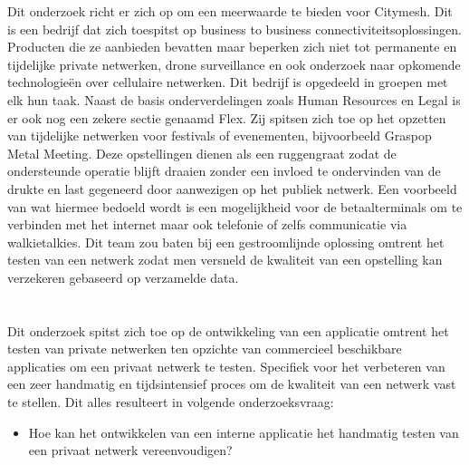
Dit onderzoek richt er zich op om een meerwaarde te bieden voor Citymesh. Dit is een bedrijf dat zich toespitst op business to business connectiviteitsoplossingen. Producten die ze aanbieden bevatten maar beperken zich niet tot permanente en tijdelijke private netwerken, drone surveillance en ook onderzoek naar opkomende technologieën over cellulaire netwerken. Dit bedrijf is opgedeeld in groepen met elk hun taak. Naast de basis onderverdelingen zoals Human Resources en Legal is er ook nog een zekere sectie genaamd Flex. Zij spitsen zich toe op het opzetten van tijdelijke netwerken voor festivals of evenementen, bijvoorbeeld Graspop Metal Meeting. Deze opstellingen dienen als een ruggengraat zodat de ondersteunde operatie blijft draaien zonder een invloed te ondervinden van de drukte en last gegeneerd door aanwezigen op het publiek netwerk. Een voorbeeld van wat hiermee bedoeld wordt is een mogelijkheid voor de betaalterminals om te verbinden met het internet maar ook telefonie of zelfs communicatie via walkietalkies. Dit team zou baten bij een gestroomlijnde oplossing omtrent het testen van een netwerk zodat men versneld de kwaliteit van een opstelling kan verzekeren gebaseerd op verzamelde data.

\section{}%
\label{sec:onderzoeksvraag}

Dit onderzoek spitst zich toe op de ontwikkeling van een applicatie omtrent het testen van private netwerken ten opzichte van commercieel beschikbare applicaties om een privaat netwerk te testen. Specifiek voor het verbeteren van een zeer handmatig en tijdsintensief proces om de kwaliteit van een netwerk vast te stellen. Dit alles resulteert in volgende onderzoeksvraag:
\begin{itemize}
    \item Hoe kan het ontwikkelen van een interne applicatie het handmatig testen van een privaat netwerk vereenvoudigen?
\end{itemize}

